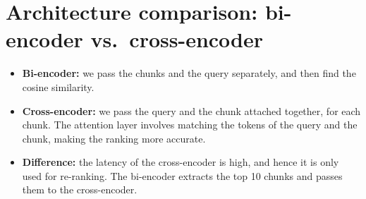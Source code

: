 \documentclass[11pt,a4paper]{article}
\begin{document}
\section{Architecture comparison: bi-encoder vs.\ cross-encoder}
\begin{itemize}[leftmargin=1.2em]
\item \textbf{Bi-encoder:} we pass the chunks and the query separately, and then find the cosine similarity.
\item \textbf{Cross-encoder:} we pass the query and the chunk attached together, for each chunk. The attention layer involves matching the tokens of the query and the chunk, making the ranking more accurate.
\item \textbf{Difference:} the latency of the cross-encoder is high, and hence it is only used for re-ranking. The bi-encoder extracts the top 10 chunks and passes them to the cross-encoder.
\end{itemize}
\end{document}
